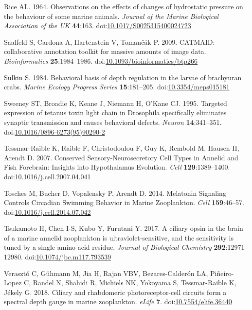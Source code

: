 \documentclass[
  11pt,
]{article}
\newlength{\cslhangindent}
\newenvironment{CSLReferences}[2] %
 {\begin{list}{}{%
  \setlength{\itemindent}{0pt}
  \setlength{\leftmargin}{0pt}
  \setlength{\parsep}{0pt}
  \ifodd #1
   \setlength{\leftmargin}{\cslhangindent}
   \setlength{\itemindent}{-1\cslhangindent}
  \fi
  \setlength{\itemsep}{#2\baselineskip}}}
 {\end{list}}
\begin{document}
\begin{CSLReferences}{1}{0}
Rice AL. 1964. Observations on the effects of changes of hydrostatic
pressure on the behaviour of some marine animals. \emph{Journal of the
Marine Biological Association of the {UK}} \textbf{44}:163.
doi:\href{https://doi.org/10.1017/S0025315400024723}{10.1017/S0025315400024723}

Saalfeld S, Cardona A, Hartenstein V, Tomančák P. 2009. CATMAID:
collaborative annotation toolkit for massive amounts of image data.
\emph{Bioinformatics} \textbf{25}:1984--1986.
doi:\href{https://doi.org/10.1093/bioinformatics/btp266}{10.1093/bioinformatics/btp266}

Sulkin S. 1984. Behavioral basis of depth regulation in the larvae of
brachyuran crabs. \emph{Marine Ecology Progress Series}
\textbf{15}:181--205.
doi:\href{https://doi.org/10.3354/meps015181}{10.3354/meps015181}

Sweeney ST, Broadie K, Keane J, Niemann H, O'Kane CJ. 1995. Targeted
expression of tetanus toxin light chain in Drosophila specifically
eliminates synaptic transmission and causes behavioral defects.
\emph{Neuron} \textbf{14}:341--351.
doi:\href{https://doi.org/10.1016/0896-6273(95)90290-2}{10.1016/0896-6273(95)90290-2}

Tessmar-Raible K, Raible F, Christodoulou F, Guy K, Rembold M, Hausen H,
Arendt D. 2007. Conserved Sensory-Neurosecretory Cell Types in Annelid
and Fish Forebrain: Insights into Hypothalamus Evolution. \emph{Cell}
\textbf{129}:1389--1400.
doi:\href{https://doi.org/10.1016/j.cell.2007.04.041}{10.1016/j.cell.2007.04.041}

Tosches M, Bucher D, Vopalensky P, Arendt D. 2014. Melatonin Signaling
Controls Circadian Swimming Behavior in Marine Zooplankton. \emph{Cell}
\textbf{159}:46--57.
doi:\href{https://doi.org/10.1016/j.cell.2014.07.042}{10.1016/j.cell.2014.07.042}

Tsukamoto H, Chen I-S, Kubo Y, Furutani Y. 2017. A ciliary opsin in the
brain of a marine annelid zooplankton is ultraviolet-sensitive, and the
sensitivity is tuned by a single amino acid residue. \emph{Journal of
Biological Chemistry} \textbf{292}:12971--12980.
doi:\href{https://doi.org/10.1074/jbc.m117.793539}{10.1074/jbc.m117.793539}

Verasztó C, Gühmann M, Jia H, Rajan VBV, Bezares-Calderón LA,
Piñeiro-Lopez C, Randel N, Shahidi R, Michiels NK, Yokoyama S,
Tessmar-Raible K, Jékely G. 2018. Ciliary and rhabdomeric
photoreceptor-cell circuits form a spectral depth gauge in marine
zooplankton. \emph{eLife} \textbf{7}.
doi:\href{https://doi.org/10.7554/elife.36440}{10.7554/elife.36440}


\end{CSLReferences}
\end{document}

